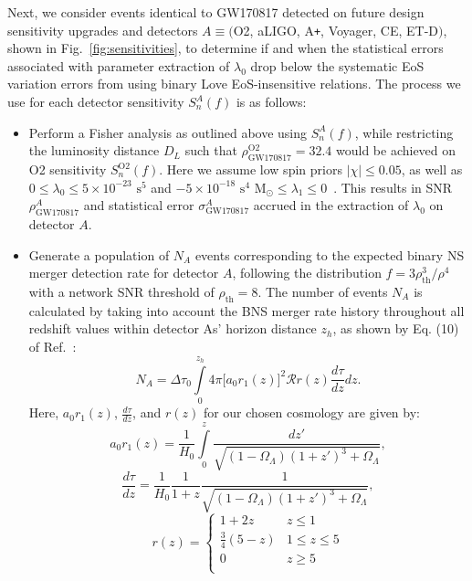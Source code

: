 \documentclass[prd,twocolumn,nofootinbib,superscriptaddress,amsmath,amssymb]{revtex4-1}
\begin{document}
Next, we consider events identical to GW170817 detected on future design sensitivity upgrades and detectors $A \equiv ($O2, aLIGO, A\texttt{+}, Voyager, CE, ET-D$)$, shown in Fig.~\ref{fig:sensitivities}, to determine if and when the statistical errors associated with parameter extraction of $\lambda_0$ drop below the systematic EoS variation errors from using binary Love EoS-insensitive relations.
The process we use for each detector sensitivity $S_n^A(f)$ is as follows:
\begin{itemize}
\item Perform a Fisher analysis as outlined above using $S_n^A(f)$, while restricting the luminosity distance $D_L$ such that $\rho^{\text{O2}}_{\text{GW170817}}=32.4$ would be achieved on O2 sensitivity $S_n^{\text{O2}}(f)$.
Here we assume low spin priors $|\chi| \leq 0.05$, as well as $0 \leq \lambda_0 \leq 5 \times 10^{-23} \text{ s}^5$ and $-5 \times 10^{-18} \text{ s}^4\text{ M}_{\odot} \leq \lambda_1 \leq 0$~\cite{delPozzo:TaylorTidal}.
This results in SNR $\rho^A_{\text{GW170817}}$ and statistical error $\sigma_\text{GW170817}^A$ accrued in the extraction of $\lambda_0$ on detector $A$.
\item Generate a population of $N_A$ events corresponding to the expected binary NS merger detection rate for detector $A$, following the distribution $f=3 \rho_{\text{th}}^3/\rho^4$~\cite{Shutz:SNR,Chen:SNR} with a network SNR threshold of $\rho_{\text{th}}=8$.
The number of events $N_A$ is calculated by taking into account the BNS merger rate history throughout all redshift values within detector As' horizon distance $z_h$, as shown by Eq. (10) of Ref.~\cite{Cutler:BNSmerger}:
\begin{equation}
N_A=\Delta \tau_0 \int\limits^{z_{h}}_0 4 \pi \lbrack  a_0r_1(z)\rbrack^2 \mathcal{R} r(z) \frac{d \tau}{dz} dz.
\end{equation}
Here, $a_0r_1(z)$, $\frac{d\tau}{dz}$, and $r(z)$ for our chosen cosmology are given by:
\begin{equation}
a_0r_1(z) = \frac{1}{H_0}\int\limits^z_0 \frac{dz'}{\sqrt{(1-\Omega_{\Lambda})(1+z')^3+\Omega_{\Lambda}}},
\end{equation}
\begin{equation}
\frac{d\tau}{dz} = \frac{1}{H_0} \frac{1}{1+z}\frac{1}{\sqrt{(1-\Omega_{\Lambda})(1+z')^3+\Omega_{\Lambda}}},
\end{equation}
\begin{equation}
r(z) = \left\{
\begin{array}{ll}
      1+2z & z \leq 1 \\
      \frac{3}{4}(5-z) & 1\leq z\leq 5 \\
      0 & z\geq 5\\ 
\end{array} 
\right.
\end{equation}


\end{itemize}
\end{document}
